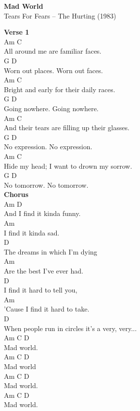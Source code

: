 \documentclass[a4paper]{article}
\begin{document}
    \begin{center}
        \textbf{Mad World}
        ~\\
        Tears For Fears -- The Hurting (1983)
    \end{center}
    {
        \scriptsize
        \textbf{Verse 1}
        ~\\
        {
            \cutive
            \obeyspaces
Am                   C
\\
All around me are familiar faces.
\\
G                 D
\\
Worn out places.  Worn out faces.
\\
Am                         C
\\
Bright and early for their daily races.
\\
G               D
\\
Going nowhere.  Going nowhere.
\\
Am                          C
\\
And their tears are filling up their glasses.
\\
G               D
\\
No expression.  No expression.
\\
Am                      C
\\
Hide my head; I want to drown my sorrow.
\\
G             D
\\
No tomorrow.  No tomorrow.
\\

        }
        \textbf{Chorus}
        ~\\
        {
            \cutive
            \obeyspaces
Am                  D
\\
And I find it kinda funny.
\\
                Am
\\
I find it kinda sad.
\\
                        D
\\
The dreams in which I'm dying
\\
                       Am
\\
Are the best I've ever had.
\\
                  D
\\
I find it hard to tell you,
\\
                      Am
\\
'Cause I find it hard to take.
\\
                   D
\\
When people run in circles it's a very, very...
\\
Am C   D
\\
   Mad world.
\\
Am C   D
\\
   Mad world
\\
Am C   D
\\
   Mad world.
\\
Am C   D
\\
   Mad world.
\\

}}
\end{document}
